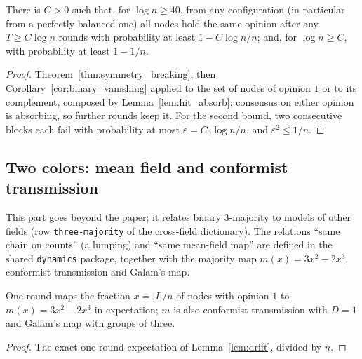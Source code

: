 \begin{theorem}\label{thm:any_start}
  \leanok
  There is $C > 0$ such that, for $\log n \ge 40$, from any configuration (in particular from a
  perfectly balanced one) all nodes hold the same opinion after any $T \ge C\log n$ rounds with
  probability at least $1 - C\log n/n$; and, for $\log n \ge C$, with probability at least
  $1 - 1/n$.
\end{theorem}
\begin{proof}
  \leanok
  Theorem~\ref{thm:symmetry_breaking}, then Corollary~\ref{cor:binary_vanishing} applied to the
  set of nodes of opinion $1$ or to its complement, composed by Lemma~\ref{lem:hit_absorb};
  consensus on either opinion is absorbing, so further rounds keep it. For the second bound, two
  consecutive blocks each fail with probability at most $\varepsilon = C_0\log n/n$, and
  $\varepsilon^2 \le 1/n$.
\end{proof}

\subsection{Two colors: mean field and conformist transmission}\label{sec:mean_field}

This part goes beyond the paper; it relates binary 3-majority to models of other fields (row
\texttt{three-majority} of the cross-field dictionary). The relations ``same chain on counts''
(a lumping) and ``same mean-field map'' are defined in the shared \texttt{dynamics} package,
together with the majority map $m(x) = 3x^2 - 2x^3$, conformist transmission and Galam's map.

\begin{theorem}\label{thm:binary_mean_field}
  \leanok
  One round maps the fraction $x = |I|/n$ of nodes with opinion $1$ to $m(x) = 3x^2 - 2x^3$ in
  expectation; $m$ is also conformist transmission with $D = 1$ and Galam's map with groups of
  three.
\end{theorem}
\begin{proof}
  \leanok
  The exact one-round expectation of Lemma~\ref{lem:drift}, divided by $n$.
\end{proof}

